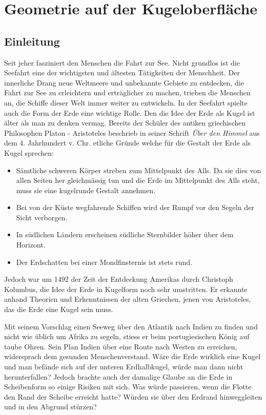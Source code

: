 \chapter{Geometrie auf der Kugeloberfläche\label{chapter:kugel}}
\begin{refsection}

\section{Einleitung}
Seit jeher fasziniert den Menschen die Fahrt zur See. Nicht grundlos ist die Seefahrt eine der wichtigsten und ältesten Tätigkeiten der Menschheit. Der innerliche Drang neue Weltmeere und unbekannte Gebiete zu entdecken, die Fahrt zur See zu erleichtern und erträglicher zu machen, trieben die Menschen an, die Schiffe dieser Welt immer weiter zu entwickeln.
In der Seefahrt spielte auch die Form der Erde eine wichtige Rolle. Den die Idee der Erde als Kugel ist älter als man zu denken vermag. Bereits der Schüler des antiken griechischen Philosophen Platon - Aristoteles beschrieb in seiner Schrift \textit{Über den Himmel} aus dem 4. Jahrhundert v. Chr. etliche Gründe welche für die Gestalt der Erde als Kugel sprechen:
\begin{itemize}
      \item Sämtliche schweren Körper streben zum Mittelpunkt des Alls. Da sie dies von allen Seiten her gleichmässig tun und die Erde im Mittelpunkt des Alls steht, muss sie eine kugelrunde Gestalt annehmen. 
\item Bei von der Küste wegfahrende Schiffen wird der Rumpf vor den Segeln der Sicht verborgen. 
\item In südlichen Ländern erscheinen südliche Sternbilder höher über dem Horizont.
\item Der Erdschatten bei einer Mondfinsternis ist stets rund.
\end{itemize}

Jedoch war um 1492 der Zeit der Entdeckung Amerikas durch Christoph Kolumbus, die Idee der Erde in Kugelform noch sehr umstritten. Er erkannte anhand Theorien und Erkenntnissen der alten Griechen, jenen von Aristoteles, das die Erde eine Kugel sein muss.

Mit seinem Vorschlag einen Seeweg über den Atlantik nach Indien zu finden und nicht wie üblich um Afrika zu segeln, stiess er beim portugiesischen König auf taube Ohren. Sein Plan Indien über eine Route nach Westen zu erreichen, widersprach dem gesunden Menschenverstand. Wäre die Erde wirklich eine Kugel und man befände sich auf der unteren Erdhalbkugel, würde man dann nicht herunterfallen? Jedoch brachte auch der damalige Glaube an die Erde in Scheibenform so einige Risiken mit sich. Was würde passieren, wenn die Flotte den Rand der Scheibe erreicht hatte? Würden sie über den Erdrand hinweggleiten und in den Abgrund stürzen?


\end{refsection}
